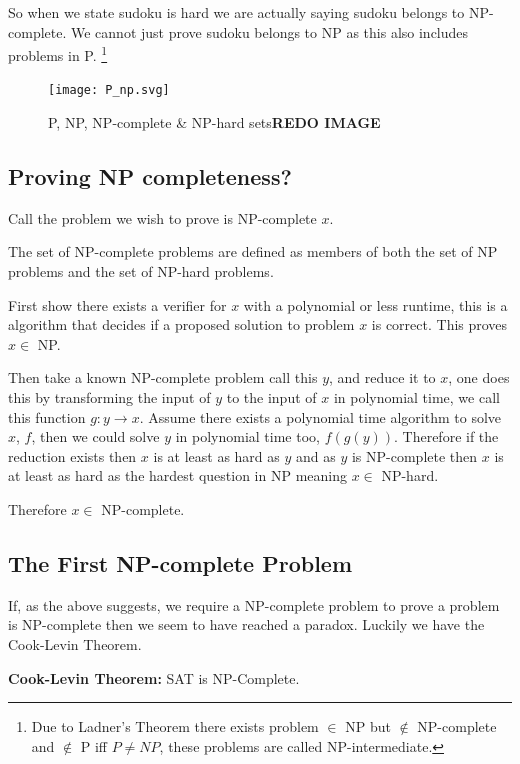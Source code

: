 \documentclass[a4paper,11pt]{report}
\newcounter{row}
\begin{document}
So when we state sudoku is hard we are actually saying sudoku belongs to NP-complete. We cannot just prove sudoku belongs to NP as this also includes problems in P. \footnote{Due to Ladner's Theorem there exists problem $\in$ NP but $\not\in$ NP-complete and $\not\in$ P iff $P\neq NP$, these problems are called NP-intermediate.}

\begin{figure}[h!]
	\begin{center}
		\texttt{[image: P\_np.svg]}
	\end{center}
	\caption{P, NP, NP-complete \& NP-hard sets\textbf{REDO IMAGE}}
\end{figure}

\subsection{Proving NP completeness?}

Call the problem we wish to prove is NP-complete $x$.

The set of NP-complete problems are defined as members of both the set of NP problems and the set of NP-hard problems. 

First show there exists a verifier for $x$ with a polynomial or less runtime, this is a algorithm that decides if a proposed solution to problem $x$ is correct. This proves $x\in$ NP.

Then take a known NP-complete problem call this $y$, and reduce it to $x$, one does this by transforming the input of $y$ to the input of $x$ in polynomial time, we call this function $g: y\rightarrow x$. Assume there exists a polynomial time algorithm to solve $x$, $f$, then we could solve $y$ in polynomial time too, $f(g(y))$. Therefore if the reduction exists then $x$ is at least as hard as $y$ and as $y$ is NP-complete then $x$ is at least as hard as the hardest question in NP meaning $x \in$ NP-hard.

Therefore $x\in $ NP-complete.

\subsection{The First NP-complete Problem} 

If, as the above suggests, we require a NP-complete problem to prove a problem is NP-complete then we seem to have reached a paradox. Luckily we have the Cook-Levin Theorem.

\textbf{Cook-Levin Theorem:} SAT is NP-Complete. \cite{compcomplexityamodernapproach}
\end{document}
